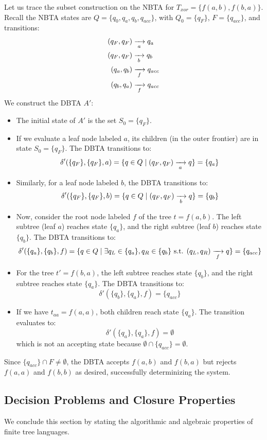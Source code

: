 \begin{example}
Let us trace the subset construction on the NBTA for $T_{xor} = \{ f(a,b), f(b,a) \}$.
Recall the NBTA states are $Q = \{q_0, q_a, q_b, q_{acc}\}$, with $Q_0 = \{q_F\}$, $F = \{q_{acc}\}$, and transitions:
\begin{align*}
    (q_F, q_F) &\xrightarrow[{\;a\;}]{} q_a \\
    (q_F, q_F) &\xrightarrow[{\;b\;}]{} q_b \\
    (q_a, q_b) &\xrightarrow[{\;f\;}]{} q_{acc} \\
    (q_b, q_a) &\xrightarrow[{\;f\;}]{} q_{acc}
\end{align*}
We construct the DBTA $A'$:
\begin{itemize}
    \item The initial state of $A'$ is the set $S_0 = \{q_F\}$.
    \item If we evaluate a leaf node labeled $a$, its children (in the outer frontier) are in state $S_0 = \{q_F\}$. The DBTA transitions to:
    $$\delta'( \{q_F\}, \{q_F\}, a ) = \{ q \in Q \mid (q_F, q_F) \xrightarrow[{\;a\;}]{} q \} = \{ q_a \}$$
    \item Similarly, for a leaf node labeled $b$, the DBTA transitions to:
    $$\delta'( \{q_F\}, \{q_F\}, b ) = \{ q \in Q \mid (q_F, q_F) \xrightarrow[{\;b\;}]{} q \} = \{ q_b \}$$
    \item Now, consider the root node labeled $f$ of the tree $t = f(a,b)$. The left subtree (leaf $a$) reaches state $\{q_a\}$, and the right subtree (leaf $b$) reaches state $\{q_b\}$. The DBTA transitions to:
    $$\delta'( \{q_a\}, \{q_b\}, f ) = \{ q \in Q \mid \exists q_L \in \{q_a\}, q_R \in \{q_b\} \text{ s.t. } (q_L, q_R) \xrightarrow[{\;f\;}]{} q \} = \{ q_{acc} \}$$
    \item For the tree $t' = f(b,a)$, the left subtree reaches state $\{q_b\}$, and the right subtree reaches state $\{q_a\}$. The DBTA transitions to:
    $$\delta'( \{q_b\}, \{q_a\}, f ) = \{ q_{acc} \}$$
    \item If we have $t_{aa} = f(a,a)$, both children reach state $\{q_a\}$. The transition evaluates to:
    $$\delta'( \{q_a\}, \{q_a\}, f ) = \emptyset$$
    which is not an accepting state because $\emptyset \cap \{q_{acc}\} = \emptyset$.
\end{itemize}
Since $\{q_{acc}\} \cap F \neq \emptyset$, the DBTA accepts $f(a,b)$ and $f(b,a)$ but rejects $f(a,a)$ and $f(b,b)$ as desired, successfully determinizing the system.
\end{example}

\subsection{Decision Problems and Closure Properties}
We conclude this section by stating the algorithmic and algebraic properties of finite tree languages.

